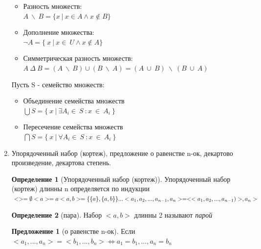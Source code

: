 \documentclass[a4paper]{article}
\theoremstyle{definition}
\newtheorem*{definition*}{Определение}
\newtheorem*{proposition*}{Предложение}
\begin{document}
\begin{enumerate}
\begin{itemize}
        \item Разность множеств:
              \\ $A \ \backslash\  B = \{x\ | \ x\in{A} \land x\notin{B} \}$
        \item Дополнение множества:
              \\ $\neg{A} = \{\ x\ |\ x \in{\ U} \land{x \notin{A}}\} $
        \item Симметрическая разность множеств:
              \\ $A \ \Delta \ B = (A \  \backslash \ B) \cup{(B \ \backslash{\ A})} = (A\ \cup{\ B })\ \backslash \ (B\ \cup{\ A } ) $
       \end{itemize}
       Пусть S - семейство множеств:
       \begin{itemize}
        \item Объединение семейства множеств\\
              $\bigcup{S} = \{\ x\ |\ \exists{A_i} \in{\ S \ }:x\ \in{\ A_i \ }\}$
        \item Пересечение семейства множеств\\
              $\bigcap{S} = \{\ x\ |\ \forall{A_i} \in{\ S\ }: x\ \in{\ A_i \ } \}$
       \end{itemize}
 \item Упорядоченный набор (кортеж), предложение о равенстве n-ок, декартово произведение, декартова степень.
       \begin{definition*}[Упорядоченный набор (кортеж)]
        Упорядоченный набор (кортеж) длинны n определяется по индукции
        \begin{math}\\
         <> = \emptyset\\
         <a> = a\\
         <a,b> = \{\{a\},\{a,b\}\}
         \\
         ...
         \\
         <a_1, a_2, ...,a_{n-1} ,a_n> = <<a_1, a_2, ...,a_{n-1})>, a_n>
        \end{math}
       \end{definition*}
       \begin{definition*}[пара]
        Набор $<a,b>$ длинны 2 называют \textit{парой}
       \end{definition*}
       \begin{proposition*}[о равенстве n-ок]
        Если \\ \mbox{$<a_1,...,a_n> = <b_1, ..., b_n> \Leftrightarrow a_1 = b_1, ..., a_n = b_n$}
       \end{proposition*}

\end{enumerate}
\end{document}
